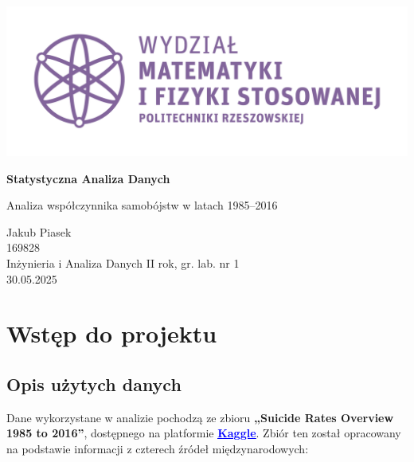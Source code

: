 \documentclass[polish]{article}
\begin{document}
    \LARGE\begin{titlepage}

        \begin{center}

        \includegraphics*{img/wmifs_pl.png}



        \vspace{3cm}

        \textbf{Statystyczna Analiza Danych}

        \vspace{1cm}
            Analiza współczynnika samobójstw w latach 1985–2016

        \vspace{5cm}

        \raggedleft\vfil
        Jakub Piasek\\
        169828 \\
        Inżynieria i Analiza Danych II rok, gr. lab. nr 1\\
        30.05.2025


        \end{center}

    \end{titlepage}

    \normalsize

    \tableofcontents

    \newpage

    \section{Wstęp do projektu}

    \subsection{Opis użytych danych}

    Dane wykorzystane w analizie pochodzą ze zbioru \textbf{„Suicide Rates Overview 1985 to 2016”}, dostępnego na platformie \textbf{\href{https://www.kaggle.com/datasets/russellyates88/suicide-rates-overview-1985-to-2016}{\textcolor{blue}{\uline{Kaggle}}}}. Zbiór ten został opracowany na podstawie informacji z czterech źródeł międzynarodowych:
\end{document}
